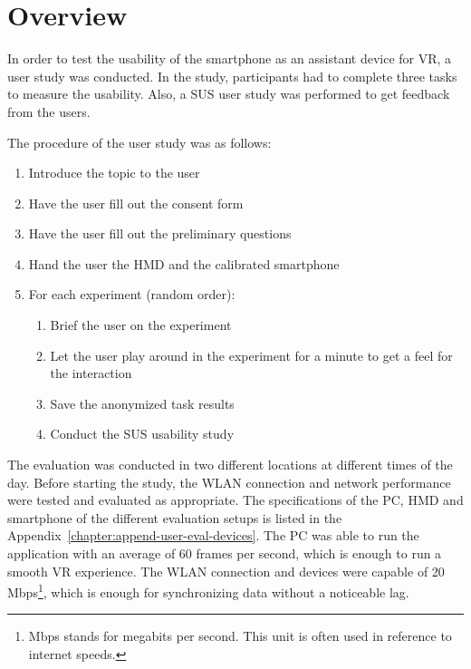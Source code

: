 \section{Overview}\label{section:evaluation-overview}
In order to test the usability of the smartphone as an assistant device for \gls{VR}, a user study was conducted. In the study, participants had to complete three tasks to measure the usability. Also, a \gls{SUS} user study was performed to get feedback from the users.

The procedure of the user study was as follows:
\begin{enumerate}
  \item Introduce the topic to the user
  \item Have the user fill out the consent form
  \item Have the user fill out the preliminary questions
  \item Hand the user the \gls{HMD} and the calibrated smartphone
  \item For each experiment (random order):
  \begin{enumerate}
    \item Brief the user on the experiment
    \item Let the user play around in the experiment for a minute to get a feel for the interaction
    \item Save the anonymized task results
    \item Conduct the \gls{SUS} usability study
  \end{enumerate}
\end{enumerate}

The evaluation was conducted in two different locations at different times of the day. Before starting the study, the \gls{WLAN} connection and network performance were tested and evaluated as appropriate. The specifications of the \gls{PC}, \gls{HMD} and smartphone of the different evaluation setups is listed in the Appendix~\ref{chapter:append-user-eval-devices}. The \gls{PC} was able to run the application with an average of 60 frames per second, which is enough to run a smooth \gls{VR} experience. The \gls{WLAN} connection and devices were capable of 20 Mbps\footnote{Mbps stands for megabits per second. This unit is often used in reference to internet speeds.}, which is enough for synchronizing data without a noticeable lag.

